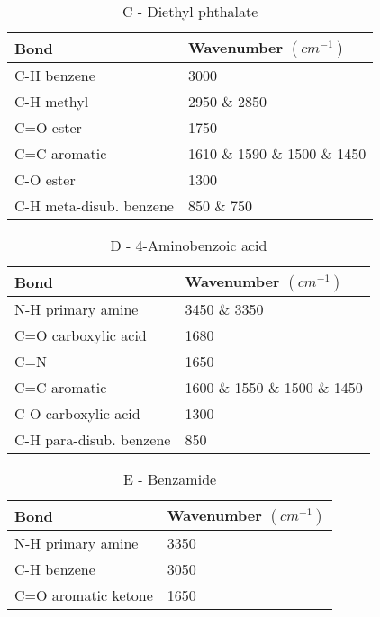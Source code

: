 \documentclass[a4paper, british]{article}
\begin{document}
\begin{table}[H]
    \centering
    \caption{C - Diethyl phthalate}
    \vspace*{2mm}
    \label{tab:C}
    \begin{tabular}{ll}
        Bond                    & Wavenumber \((cm^{-1})\)                       \\ \midrule
        C-H benzene             & 3000                         \\
        C-H methyl              & 2950 \& 2850                 \\
        C=O ester     & 1750                         \\
        C=C aromatic            & 1610 \& 1590 \& 1500 \& 1450 \\
        C-O ester     & 1300                         \\
        C-H meta-disub. benzene & 850 \& 750                   \\ 
        \bottomrule
    \end{tabular}
\end{table}

\begin{table}[H]
    \centering
    \caption{D - 4-Aminobenzoic acid}
    \vspace*{2mm}
    \label{tab:D}
    \begin{tabular}{ll}
        \toprule
        Bond                    & Wavenumber \((cm^{-1})\)                       \\ 
        \midrule
        N-H primary amine       & 3450 \& 3350                 \\
        C=O carboxylic acid     & 1680                         \\
        C=N                     & 1650                         \\
        C=C aromatic            & 1600 \& 1550 \& 1500 \& 1450 \\
        C-O carboxylic acid     & 1300                         \\
        C-H para-disub. benzene & 850                          \\ 
        \bottomrule
    \end{tabular}
\end{table}

\begin{table}[H]
    \centering
    \caption{E - Benzamide}
    \vspace*{2mm}
    \label{tab:E}
    \begin{tabular}{ll}
        \toprule
        Bond                & Wavenumber \((cm^{-1})\) \\ 
        \midrule
        N-H primary amine   & 3350   \\
        C-H benzene         & 3050   \\
        C=O aromatic ketone & 1650   \\ 
        \bottomrule
    \end{tabular}
\end{table}
\end{document}
